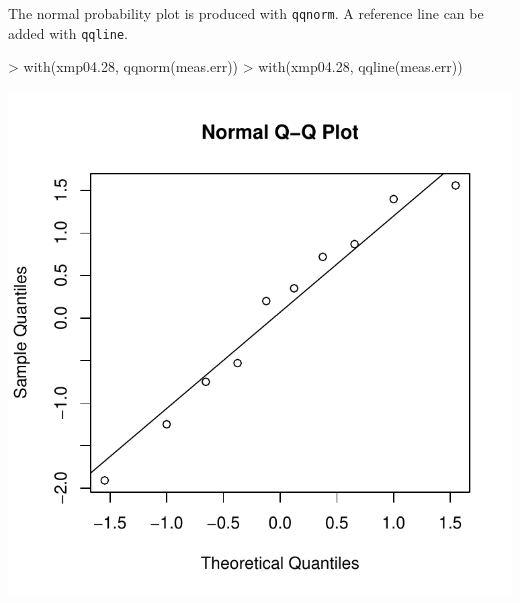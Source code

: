 \documentclass{book}
\begin{document}
The normal probability plot is produced with \texttt{qqnorm}.  A
reference line can be added with \texttt{qqline}.
\begin{center}
\begin{Schunk}
\begin{Sinput}
> with(xmp04.28, qqnorm(meas.err))
> with(xmp04.28, qqline(meas.err))
\end{Sinput}
\end{Schunk}
\includegraphics{Devore6-xmp0428}
\end{center}
\end{document}
